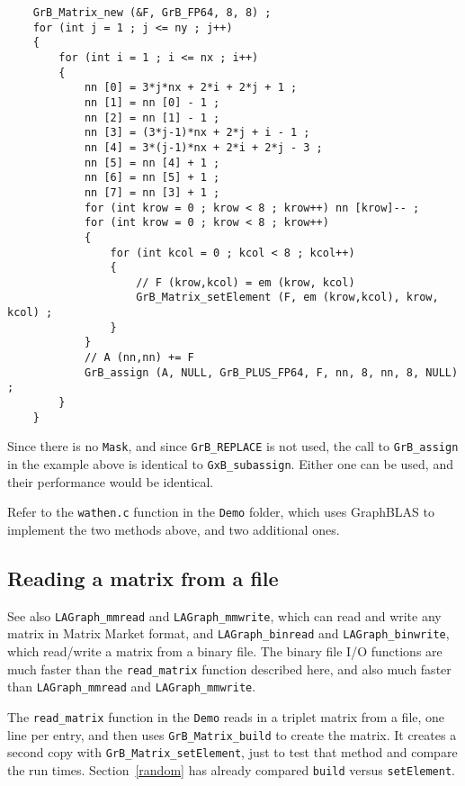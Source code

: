 \documentclass[12pt]{article}
\begin{document}
    {\footnotesize
    \begin{verbatim}
    GrB_Matrix_new (&F, GrB_FP64, 8, 8) ;
    for (int j = 1 ; j <= ny ; j++)
    {
        for (int i = 1 ; i <= nx ; i++)
        {
            nn [0] = 3*j*nx + 2*i + 2*j + 1 ;
            nn [1] = nn [0] - 1 ;
            nn [2] = nn [1] - 1 ;
            nn [3] = (3*j-1)*nx + 2*j + i - 1 ;
            nn [4] = 3*(j-1)*nx + 2*i + 2*j - 3 ;
            nn [5] = nn [4] + 1 ;
            nn [6] = nn [5] + 1 ;
            nn [7] = nn [3] + 1 ;
            for (int krow = 0 ; krow < 8 ; krow++) nn [krow]-- ;
            for (int krow = 0 ; krow < 8 ; krow++)
            {
                for (int kcol = 0 ; kcol < 8 ; kcol++)
                {
                    // F (krow,kcol) = em (krow, kcol)
                    GrB_Matrix_setElement (F, em (krow,kcol), krow, kcol) ;
                }
            }
            // A (nn,nn) += F
            GrB_assign (A, NULL, GrB_PLUS_FP64, F, nn, 8, nn, 8, NULL) ;
        }
    } \end{verbatim}}

Since there is no \verb'Mask', and since \verb'GrB_REPLACE' is not used, the call
to \verb'GrB_assign' in the example above is identical to \verb'GxB_subassign'.
Either one can be used, and their performance would be identical.

Refer to the \verb'wathen.c' function in the \verb'Demo' folder, which
uses GraphBLAS to implement the two methods above, and two additional ones.

\subsection{Reading a matrix from a file}
\label{read}

See also \verb'LAGraph_mmread' and \verb'LAGraph_mmwrite', which
can read and write any matrix in Matrix Market format, and
\verb'LAGraph_binread' and \verb'LAGraph_binwrite', which read/write a matrix
from a binary file.  The binary file I/O functions are much faster than
the \verb'read_matrix' function described here, and also much faster than
\verb'LAGraph_mmread' and \verb'LAGraph_mmwrite'.

The \verb'read_matrix' function in the \verb'Demo' reads in a triplet matrix
from a file, one line per entry, and then uses \verb'GrB_Matrix_build' to
create the matrix.  It creates a second copy with \verb'GrB_Matrix_setElement',
just to test that method and compare the run times.
Section~\ref{random} has already compared
\verb'build' versus \verb'setElement'.
\end{document}
